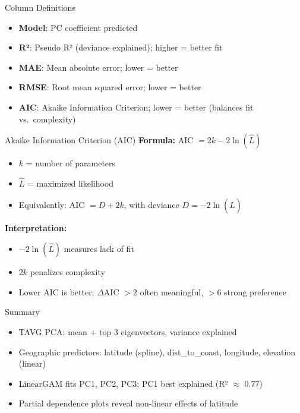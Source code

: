 \documentclass{beamer}
\begin{document}
\begin{frame}{Column Definitions}
\begin{itemize}
\item \textbf{Model}: PC coefficient predicted
\item \textbf{R²}: Pseudo R² (deviance explained); higher = better fit
\item \textbf{MAE}: Mean absolute error; lower = better
\item \textbf{RMSE}: Root mean squared error; lower = better
\item \textbf{AIC}: Akaike Information Criterion; lower = better (balances fit vs.\ complexity)
\end{itemize}
\end{frame}

\begin{frame}{Akaike Information Criterion (AIC)}
\textbf{Formula:} AIC $= 2k - 2\ln(\hat{L})$
\begin{itemize}
\item $k$ = number of parameters
\item $\hat{L}$ = maximized likelihood
\item Equivalently: AIC $= D + 2k$, with deviance $D = -2\ln(\hat{L})$
\end{itemize}
\vspace{0.5em}
\textbf{Interpretation:}
\begin{itemize}
\item $-2\ln(\hat{L})$ measures lack of fit
\item $2k$ penalizes complexity
\item Lower AIC is better; $\Delta$AIC $> 2$ often meaningful, $> 6$ strong preference
\end{itemize}
\end{frame}

\begin{frame}{Summary}
\begin{itemize}
\item TAVG PCA: mean + top 3 eigenvectors, variance explained
\item Geographic predictors: latitude (spline), dist\_to\_coast, longitude, elevation (linear)
\item LinearGAM fits PC1, PC2, PC3; PC1 best explained (R² $\approx$ 0.77)
\item Partial dependence plots reveal non-linear effects of latitude
\end{itemize}
\end{frame}
\end{document}
